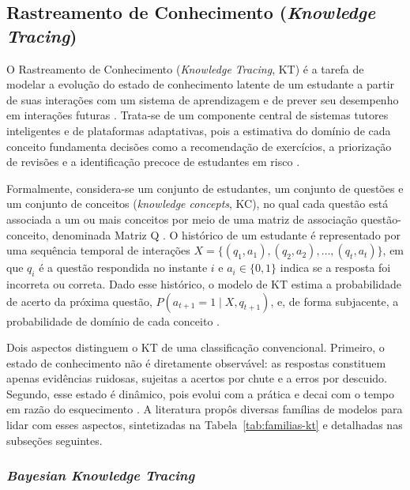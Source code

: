 \subsection{Rastreamento de Conhecimento (\textit{Knowledge Tracing})}
\label{subsec:knowledge-tracing}

O Rastreamento de Conhecimento (\textit{Knowledge Tracing}, KT) é a tarefa de modelar a evolução do estado de conhecimento latente de um estudante a partir de suas interações com um sistema de aprendizagem e de prever seu desempenho em interações futuras \cite{corbett_knowledge_1994, shen_assessing_2022}. Trata-se de um componente central de sistemas tutores inteligentes e de plataformas adaptativas, pois a estimativa do domínio de cada conceito fundamenta decisões como a recomendação de exercícios, a priorização de revisões e a identificação precoce de estudantes em risco \cite{liu_enhancing_2026, gao_transformer-based_2025}.

Formalmente, considera-se um conjunto de estudantes, um conjunto de questões e um conjunto de conceitos (\textit{knowledge concepts}, KC), no qual cada questão está associada a um ou mais conceitos por meio de uma matriz de associação questão-conceito, denominada Matriz Q \cite{liu_enhancing_2026}. O histórico de um estudante é representado por uma sequência temporal de interações $X = \{(q_1, a_1), (q_2, a_2), \ldots, (q_t, a_t)\}$, em que $q_i$ é a questão respondida no instante $i$ e $a_i \in \{0, 1\}$ indica se a resposta foi incorreta ou correta. Dado esse histórico, o modelo de KT estima a probabilidade de acerto da próxima questão, $P(a_{t+1} = 1 \mid X, q_{t+1})$, e, de forma subjacente, a probabilidade de domínio de cada conceito \cite{shen_assessing_2022, cui_rebalancing_2025}.

Dois aspectos distinguem o KT de uma classificação convencional. Primeiro, o estado de conhecimento não é diretamente observável: as respostas constituem apenas evidências ruidosas, sujeitas a acertos por chute e a erros por descuido. Segundo, esse estado é dinâmico, pois evolui com a prática e decai com o tempo em razão do esquecimento \cite{nagatani_augmenting_2019}. A literatura propôs diversas famílias de modelos para lidar com esses aspectos, sintetizadas na Tabela~\ref{tab:familias-kt} e detalhadas nas subseções seguintes.



\subsubsection{\textit{Bayesian Knowledge Tracing}}
\label{subsubsec:bkt}

